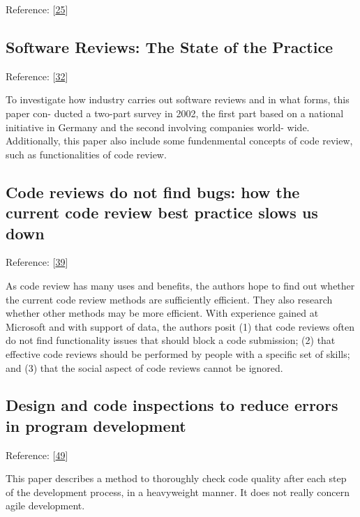 \documentclass[]{book}
\begin{document}
Reference: {[}\protect\hyperlink{ref-bosu2013impact}{25}{]}

\subsection{Software Reviews: The State of the
Practice}\label{software-reviews-the-state-of-the-practice}

Reference: {[}\protect\hyperlink{ref-ciolkowski2003software}{32}{]}

To investigate how industry carries out software reviews and in what
forms, this paper con- ducted a two-part survey in 2002, the first part
based on a national initiative in Germany and the second involving
companies world- wide. Additionally, this paper also include some
fundenmental concepts of code review, such as functionalities of code
review.

\subsection{Code reviews do not find bugs: how the current code review
best practice slows us
down}\label{code-reviews-do-not-find-bugs-how-the-current-code-review-best-practice-slows-us-down}

Reference: {[}\protect\hyperlink{ref-czerwonka2015code}{39}{]}

As code review has many uses and benefits, the authors hope to find out
whether the current code review methods are sufficiently efficient. They
also research whether other methods may be more efficient. With
experience gained at Microsoft and with support of data, the authors
posit (1) that code reviews often do not find functionality issues that
should block a code submission; (2) that effective code reviews should
be performed by people with a specific set of skills; and (3) that the
social aspect of code reviews cannot be ignored.

\subsection{Design and code inspections to reduce errors in program
development}\label{design-and-code-inspections-to-reduce-errors-in-program-development}

Reference: {[}\protect\hyperlink{ref-fagan2002design}{49}{]}

This paper describes a method to thoroughly check code quality after
each step of the development process, in a heavyweight manner. It does
not really concern agile development.
\end{document}
